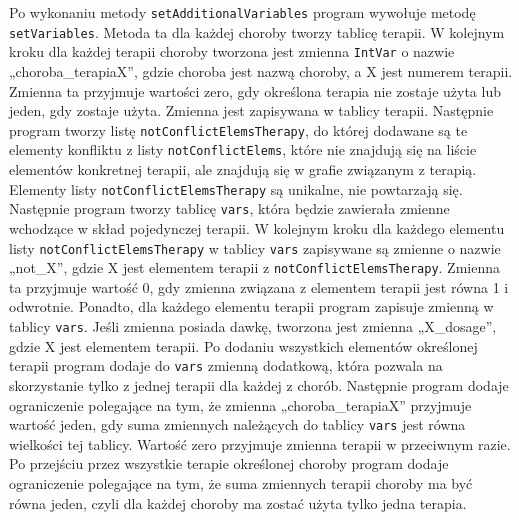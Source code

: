 Po wykonaniu metody \texttt{setAdditionalVariables} program wywołuje metodę \texttt{setVariables}. Metoda ta dla każdej choroby tworzy tablicę terapii. W kolejnym kroku dla każdej terapii choroby tworzona jest zmienna \texttt{IntVar} o nazwie „choroba\_terapiaX”, gdzie choroba jest nazwą choroby, a X jest numerem terapii. Zmienna ta przyjmuje wartości zero, gdy  określona terapia nie zostaje użyta lub jeden, gdy zostaje użyta. Zmienna jest zapisywana w tablicy terapii. Następnie program tworzy listę \texttt{notConflictElemsTherapy}, do której dodawane są te elementy konfliktu z listy \texttt{notConflictElems}, które nie znajdują się na liście elementów konkretnej terapii, ale znajdują się w grafie związanym z terapią. Elementy listy \texttt{notConflictElemsTherapy} są unikalne, nie powtarzają się. Następnie program tworzy tablicę \texttt{vars}, która będzie zawierała zmienne wchodzące w skład pojedynczej terapii. W kolejnym kroku dla każdego elementu listy \texttt{notConflictElemsTherapy} w tablicy \texttt{vars} zapisywane są zmienne o nazwie „not\_X”, gdzie X jest elementem terapii z \texttt{notConflictElemsTherapy}. Zmienna ta przyjmuje wartość 0, gdy zmienna związana z elementem terapii jest równa 1 i odwrotnie. Ponadto, dla każdego elementu terapii program zapisuje zmienną w tablicy \texttt{vars}. Jeśli zmienna posiada dawkę, tworzona jest zmienna „X\_dosage”, gdzie X jest elementem terapii. Po dodaniu wszystkich elementów określonej terapii program dodaje do \texttt{vars} zmienną dodatkową, która pozwala na skorzystanie tylko z jednej terapii dla każdej z chorób. Następnie program dodaje ograniczenie polegające na tym, że zmienna „choroba\_terapiaX” przyjmuje wartość jeden, gdy suma zmiennych należących do tablicy \texttt{vars} jest równa wielkości tej tablicy. Wartość zero przyjmuje zmienna terapii w przeciwnym razie. Po przejściu przez wszystkie terapie określonej choroby program dodaje ograniczenie polegające na tym, że suma zmiennych terapii choroby ma być równa jeden, czyli dla każdej choroby ma zostać użyta tylko jedna terapia. 

